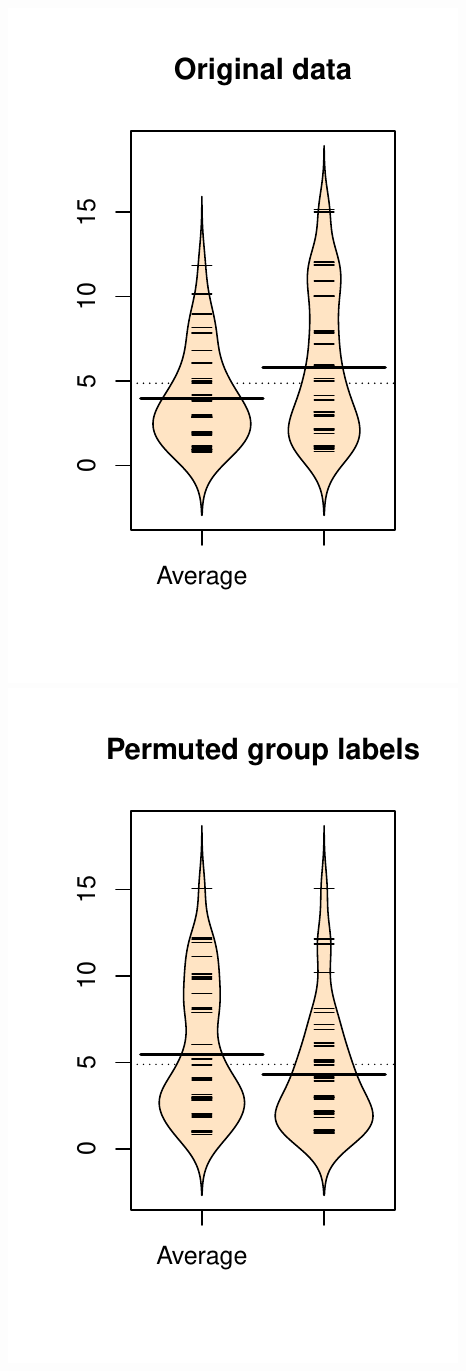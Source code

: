 \documentclass[]{book}
\begin{document}
\includegraphics{GreenwoodBanner_files/figure-latex/Figure2-8-1.pdf}
\includegraphics{GreenwoodBanner_files/figure-latex/Figure2-8-2.pdf}
\end{document}
